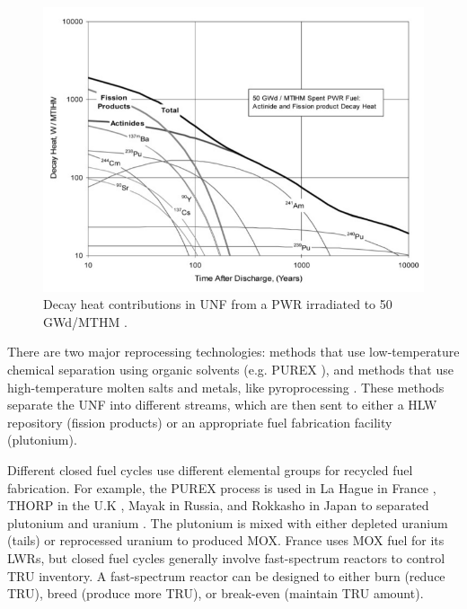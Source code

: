 \begin{figure}[htbp!]
	\begin{center}
		\includegraphics[scale=0.3]{./images/decay_heat.png}
	\end{center}
	\caption{Decay heat contributions in \gls{UNF} from a \gls{PWR} irradiated
		to 50 GWd/MTHM \cite{wigeland_separations_2006}.}
	\label{fig:decay_heat}
\end{figure}


There are two major reprocessing technologies:
methods that use low-temperature chemical separation
using organic solvents (e.g. PUREX \cite{baumgaertner_purex_1976}), and
methods that use high-temperature molten salts and metals, like pyroprocessing
\cite{laidler_development_1997}. These methods separate the \gls{UNF}
into different streams, which are then sent to either a \gls{HLW} repository
(fission products) or an appropriate fuel fabrication facility (plutonium).

Different closed fuel cycles use different elemental groups for recycled
fuel fabrication. For example, the PUREX process is used in La Hague in France
\cite{schneider_spent_2008}, THORP in the U.K \cite{riley_technology_1998},
Mayak in Russia, and Rokkasho in Japan to separated plutonium and uranium
\cite{birkett_recent_2005}. The plutonium is mixed with either depleted
uranium (tails) or reprocessed uranium to produced \gls{MOX}. France
uses \gls{MOX} fuel for its \glspl{LWR}, but closed fuel cycles 
generally involve fast-spectrum reactors to control TRU inventory.
A fast-spectrum reactor can be designed to either burn (reduce TRU),
breed (produce more TRU), or break-even (maintain TRU amount).

